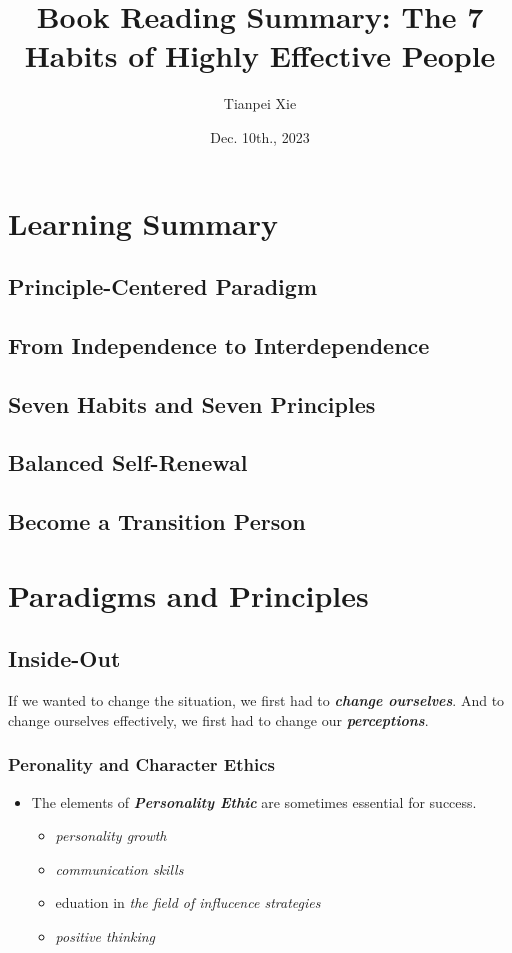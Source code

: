 \documentclass[11pt]{article}
\begin{document}
\title{Book Reading Summary: The 7 Habits of Highly Effective People}
\author{ Tianpei Xie}
\date{Dec. 10th., 2023}
\maketitle
\tableofcontents
\newpage
\section{Learning Summary}
\subsection{Principle-Centered Paradigm}
\subsection{From Independence to Interdependence}
\subsection{Seven Habits and Seven Principles}
\subsection{Balanced Self-Renewal}
\subsection{Become a Transition Person}

\section{Paradigms and Principles}
\subsection{Inside-Out}
If we wanted to change the situation, we first had to \emph{\textbf{change ourselves}}. And to change ourselves effectively, we first had to change our \emph{\textbf{perceptions}}.
\subsubsection{Peronality and Character Ethics}
\begin{itemize}
\item The elements of \emph{\textbf{Personality Ethic}} are sometimes essential for success.
\begin{itemize}
\item \emph{personality growth}
\item \emph{communication skills}
\item eduation in \emph{the field of influcence strategies}
\item \emph{positive thinking}
\end{itemize} 
\end{itemize}
\end{document}
